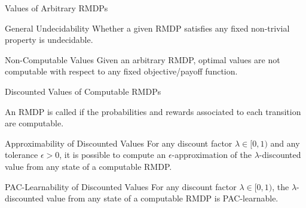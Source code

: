 \documentclass[
    hyperref = {hidelinks, linkcolor = black},
    xcolor = {dvipsnames},
    10pt
    aspectration = 169
]{beamer}
\begin{document}
    \begin{frame}{Values of Arbitrary RMDPs}
        \begin{center}

            \begin{theorem}{General Undecidability}{}
                Whether a given RMDP satisfies any fixed non-trivial\footnotemark \: property is undecidable.
            \end{theorem}

            \vspace{1cm}

            \begin{corollary}{Non-Computable Values}{}
                Given an arbitrary RMDP, optimal values are not computable with respect to any fixed objective/payoff function.
            \end{corollary}
        \end{center}

    \end{frame}

    \begin{frame}{Discounted Values of Computable RMDPs}

        An RMDP is called  if the probabilities and rewards associated to each transition are computable.

        \begin{center}

            \begin{theorem}{Approximability of Discounted Values}{}
                For any discount factor $\lambda \in [0,1)$ and any tolerance $\epsilon > 0$, it is possible to compute an $\epsilon$-approximation of the $\lambda$-discounted value from any state of a computable RMDP.
            \end{theorem}


            \begin{theorem}{PAC-Learnability of Discounted Values}{}
                For any discount factor $\lambda \in [0,1)$, the $\lambda$-discounted value from any state of a computable RMDP is PAC-learnable.
            \end{theorem}
        \end{center}
    \end{frame}
\end{document}
